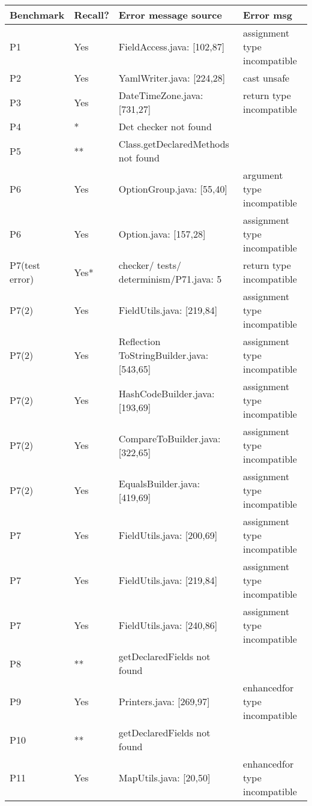 \begin{table}[]
    \begin{tabular}{|p{1.5cm}|p{1cm}|p{4cm}|p{5cm}|}
        \hline
        Benchmark & Recall? & Error message source & Error msg  \\ \hline
        P1 & Yes & FieldAccess.java: [102,87] & assignment type incompatible \\
        P2 & Yes & YamlWriter.java: [224,28] & cast unsafe  \\
        P3 & Yes & DateTimeZone.java: [731,27] &  return type incompatible \\ 
        P4 & * & Det checker not found  &   \\ 
        P5 & ** & Class.getDeclaredMethods not found &    \\ 
        P6 & Yes & OptionGroup.java: [55,40]  & argument type incompatible \\ 
        P6 & Yes & Option.java: [157,28]  &  assignment type incompatible\\
        P7(test error) & Yes* & checker/ tests/ determinism/P71.java: 5 & return type incompatible \\ 
        P7(2) & Yes & FieldUtils.java: [219,84] & assignment type incompatible \\
        P7(2) & Yes & Reflection ToStringBuilder.java: [543,65]  & assignment type incompatible  \\
        P7(2) & Yes & HashCodeBuilder.java: [193,69]  & assignment type incompatible   \\
        P7(2) & Yes & CompareToBuilder.java: [322,65] & assignment type incompatible   \\
        P7(2) & Yes & EqualsBuilder.java: [419,69]  & assignment type incompatible  \\
        P7 & Yes & FieldUtils.java: [200,69] & assignment type incompatible \\
        P7 & Yes & FieldUtils.java: [219,84] & assignment type incompatible  \\
        P7 & Yes & FieldUtils.java: [240,86] & assignment type incompatible  \\
        P8 & ** & getDeclaredFields not found &   \\
        P9 & Yes & Printers.java: [269,97]  &  enhancedfor type incompatible \\
        P10 & ** & getDeclaredFields not found  &  \\
        P11 & Yes & MapUtils.java: [20,50]   & enhancedfor type incompatible  \\

\end{tabular}
\end{table}

